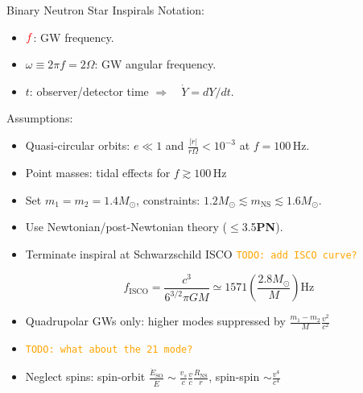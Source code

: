 \documentclass[xcolor=dvipsnames,handout,t]{beamer}
\newcommand{\todo}[1]{\textcolor{orange}{\texttt{TODO: #1}}}
\newcommand{\red}[1]{\textcolor{red}{#1}}
\newcommand{\f}{\frac}
\begin{document}
 \begin{frame}{Binary Neutron Star Inspirals}
 Notation:
 \begin{itemize}
  \item $\red{f} $: GW frequency.
  \item $\omega\equiv2\pi f = 2\Omega$: GW angular frequency.
  \item $t$: observer/detector time \quad$ \Longrightarrow\quad\dot{Y}= dY/dt$.
 \end{itemize}

  Assumptions:
  \begin{itemize}
   \item Quasi-circular orbits: $e \ll 1$ and $\tfrac{|\dot{r}|}{r\Omega} <10^{-3} $ at $f=100\,$Hz.
   \item Point masses: tidal effects for $f \gtrsim 100\,$Hz
   \item Set $m_1 =m_2 = 1.4 M_\odot$, constraints: $1.2 M_\odot \lesssim m_\text{NS}\lesssim 1.6M_\odot$.
   \item Use Newtonian/post-Newtonian theory ($\le$3.5{\bf PN}).
   \item Terminate inspiral at Schwarzschild ISCO \todo{add ISCO curve?}
   \begin{footnotesize}
   \[f_\text{ISCO} = \f{c^3}{6^{3/2}\pi G M} \simeq 1571 \left(\f{2.8M_\odot}{M}\right)\text{Hz}\] 
   \end{footnotesize}
   \item Quadrupolar GWs only: higher modes suppressed by $\tfrac{m_1-m_2}{M}\tfrac{v^2}{c^2}$
   \item \todo{what about the 21 mode?}
   \item Neglect spins: spin-orbit $\tfrac{\dot{E}_\text{SO}}{\dot{E}} \sim \tfrac{v_s}{c}\tfrac{v}{c}\tfrac{R_\text{NS}}{r}$, spin-spin $\sim \tfrac{v^4}{c^4}$
  \end{itemize}

 \end{frame}
\end{document}

